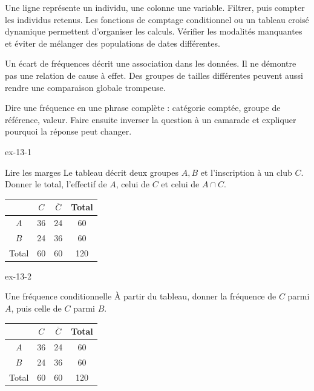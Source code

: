 \begin{savoirfaire}
Une ligne représente un individu, une colonne une variable. Filtrer, puis compter les individus retenus. Les fonctions de comptage conditionnel ou un tableau croisé dynamique permettent d’organiser les calculs. Vérifier les modalités manquantes et éviter de mélanger des populations de dates différentes.
\end{savoirfaire}
\begin{attention}Un écart de fréquences décrit une association dans les données. Il ne démontre pas une relation de cause à effet. Des groupes de tailles différentes peuvent aussi rendre une comparaison globale trompeuse.\end{attention}
Dire une fréquence en une phrase complète : catégorie comptée, groupe de référence, valeur. Faire ensuite inverser la question à un camarade et expliquer pourquoi la réponse peut changer.
\clearpage{}
\begin{blocLivre}{ex-13-1}
\begin{exercice}[1]{Lire les marges}
Le tableau décrit deux groupes $A,B$ et l’inscription à un club $C$. Donner le total, l’effectif de $A$, celui de $C$ et celui de $A\cap C$.\begin{center}\renewcommand{\arraystretch}{1.35}\begin{tabular}{c|ccc}\toprule
 & $C$ & $\overline C$ & Total\\\midrule
$A$ & 36 & 24 & 60\\
$B$ & 24 & 36 & 60\\
Total & 60 & 60 & 120\\
\bottomrule\end{tabular}\end{center}
\end{exercice}
\end{blocLivre}
\begin{blocLivre}{ex-13-2}
\begin{exercice}[1]{Une fréquence conditionnelle}
À partir du tableau, donner la fréquence de $C$ parmi $A$, puis celle de $C$ parmi $B$.\begin{center}\renewcommand{\arraystretch}{1.35}\begin{tabular}{c|ccc}\toprule
 & $C$ & $\overline C$ & Total\\\midrule
$A$ & 36 & 24 & 60\\
$B$ & 24 & 36 & 60\\
Total & 60 & 60 & 120\\
\bottomrule\end{tabular}\end{center}
\end{exercice}
\end{blocLivre}
